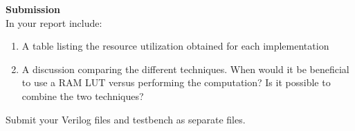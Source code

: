 \documentclass{article}
\begin{document}

\medskip
\begin{minipage}{\textwidth}
\noindent\textbf{Submission}\\
In your report include:
\begin{enumerate}
\item A table listing the resource utilization obtained for each implementation
\item A discussion comparing the different techniques. When would it be beneficial to use a RAM LUT versus performing the computation? Is it possible to combine the two techniques?
\end{enumerate}
Submit your Verilog files and testbench as separate files.
\end{minipage}

\newpage
\printbibliography
\end{document}
